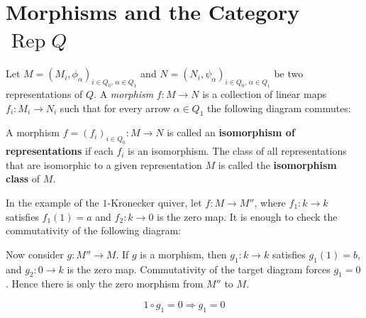 \documentclass[11pt, a4paper]{report}
\begin{document}
\section{Morphisms and the Category \texorpdfstring{$\operatorname{Rep}Q$}{Rep Q}}

\begin{definition}
    Let $M=(M_i, \phi_{\alpha})_{i \in Q_0,\, \alpha \in Q_1}$ and
    $N=(N_i, \psi_{\alpha})_{i \in Q_0,\, \alpha \in Q_1}$ be two representations of $Q$.
    A \emph{morphism} $f\colon M \to N$ is a collection of linear maps $f_i\colon M_i \to N_i$ such that for every arrow $\alpha \in Q_1$ the following diagram commutes:
    \begin{center}
    \end{center}
    A morphism $f=(f_i)_{i \in Q_0}: M\to N$ is called an \textbf{isomorphism of representations} if each $f_i$ is an isomorphism. The class of all representations that are isomorphic to a given representation $M$ is called the \textbf{isomorphism class} of $M$.
\end{definition}

\begin{example}
    In the example of the $1$-Kronecker quiver, let $f: M \to M''$, where $f_1: k \to k$ satisfies $f_1(1)=a$ and $f_2: k \to 0$ is the zero map. It is enough to check the commutativity of the following diagram:
    \begin{center}
    \end{center}

    Now consider $g: M'' \to M$. If $g$ is a morphism, then $g_1: k \to k$ satisfies $g_1(1)=b$, and $g_2: 0 \to k$ is the zero map. Commutativity of the target diagram forces $g_1=0$. Hence there is only the zero morphism from $M''$ to $M$.
    \begin{center}
    \end{center}

    \[ 1 \circ g_1 = 0 \Rightarrow g_1=0 \]
\end{example}
\end{document}
